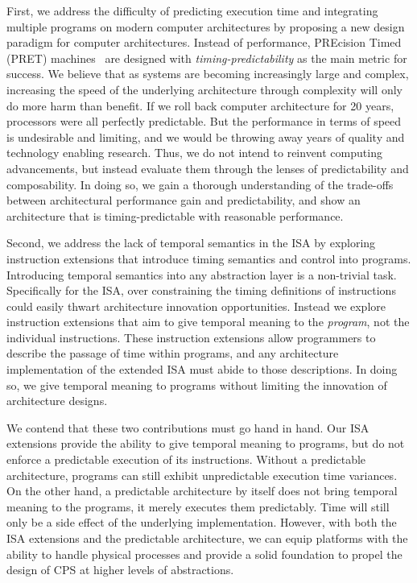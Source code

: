 First, we address the difficulty of predicting execution time and integrating multiple programs on modern computer architectures by proposing a new design paradigm for computer architectures.
Instead of performance, PREcision Timed (PRET) machines~\cite{edwards2007case} are designed with \textit{timing-predictability} as the main metric for success.   
We believe that as systems are becoming increasingly large and complex, increasing the speed of the underlying architecture through complexity will only do more harm than benefit.  
If we roll back computer architecture for 20 years, processors were all perfectly predictable.
But the performance in terms of speed is undesirable and limiting, and we would be throwing away years of quality and technology enabling research. 
Thus, we do not intend to reinvent computing advancements, but instead evaluate them through the lenses of predictability and composability.
In doing so, we gain a thorough understanding of the trade-offs between architectural performance gain and predictability, and show an architecture that is timing-predictable with reasonable performance.      

Second, we address the lack of temporal semantics in the ISA by exploring instruction extensions that introduce timing semantics and control into programs.
Introducing temporal semantics into any abstraction layer is a non-trivial task. 
Specifically for the ISA, over constraining the timing definitions of instructions could easily thwart architecture innovation opportunities.
Instead we explore instruction extensions that aim to give temporal meaning to the \emph{program}, not the individual instructions. 
These instruction extensions allow programmers to describe the passage of time within programs, and any architecture implementation of the extended ISA must abide to those descriptions. 
In doing so, we give temporal meaning to programs without limiting the innovation of architecture designs.

We contend that these two contributions must go hand in hand. 
Our ISA extensions provide the ability to give temporal meaning to programs, but do not enforce a predictable execution of its instructions.
Without a predictable architecture, programs can still exhibit unpredictable execution time variances.    
On the other hand, a predictable architecture by itself does not bring temporal meaning to the programs, it merely executes them predictably.
Time will still only be a side effect of the underlying implementation.
However, with both the ISA extensions and the predictable architecture, we can equip platforms with the ability to handle physical processes and provide 
a solid foundation to propel the design of CPS at higher levels of abstractions.       
 
